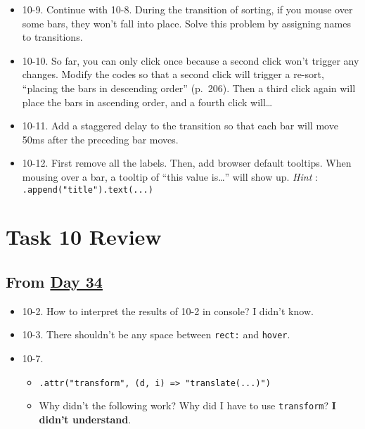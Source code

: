 \documentclass[
]{book}
\begin{document}
\begin{itemize}
\item
  10-9. Continue with 10-8. During the transition of sorting, if you mouse over some bars, they won't fall into place. Solve this problem by assigning names to transitions.
\item
  10-10. So far, you can only click once because a second click won't trigger any changes. Modify the codes so that a second click will trigger a re-sort, ``placing the bars in descending order'' (p.~206). Then a third click again will place the bars in ascending order, and a fourth click will\ldots{}
\item
  10-11. Add a staggered delay to the transition so that each bar will move 50ms after the preceding bar moves.
\item
  10-12. First remove all the labels. Then, add browser default tooltips. When mousing over a bar, a tooltip of ``this value is\ldots{}'' will show up. \emph{Hint} : \texttt{.append("title").text(...)}
\end{itemize}

\hypertarget{task-10-review}{%
\section{Task 10 Review}\label{task-10-review}}

\hypertarget{from-day-34}{%
\subsection{\texorpdfstring{From \href{https://observablehq.com/@hongtaoh/day-34-2020-09-27}{Day 34}}{From Day 34}}\label{from-day-34}}

\begin{itemize}
\item
  10-2. How to interpret the results of 10-2 in console? I didn't know.
\item
  10-3. There shouldn't be any space between \texttt{rect:} and \texttt{hover}.
\item
  10-7.

  \begin{itemize}
  \item
    \texttt{.attr("transform",\ (d,\ i)\ =\textgreater{}\ "translate(...)")}
  \item
    Why didn't the following work? Why did I have to use \texttt{transform}? \textbf{I didn't understand}.
  \end{itemize}
\end{itemize}
\end{document}

